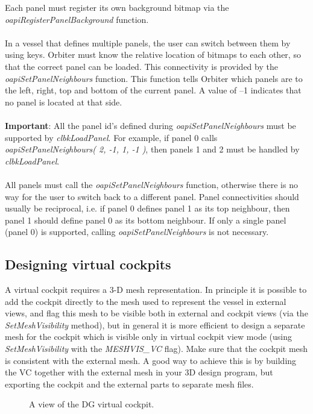 \documentclass[Orbiter Developer Manual.tex]{subfiles}
\begin{document}
\noindent
Each panel must register its own background bitmap via the \textit{oapiRegisterPanelBackground} function.\\
\\
In a vessel that defines multiple panels, the user can switch between them by using \Ctrl\DArrow\UArrow\RArrow\LArrow keys. Orbiter must know the relative location of bitmaps to each other, so that the correct panel can be loaded. This connectivity is provided by the \textit{oapiSetPanelNeighbours} function. This function tells Orbiter which panels are to the left, right, top and bottom of the current panel. A value of –1 indicates that no panel is located at that side.\\
\\
\textbf{Important}: All the panel id’s defined during \textit{oapiSetPanelNeighbours} must be supported by \textit{clbkLoadPanel}. For example, if panel 0 calls \textit{oapiSetPanelNeighbours( 2, -1, 1, -1 )}, then panels 1 and 2 must be handled by \textit{clbkLoadPanel}.\\
\\
All panels must call the \textit{oapiSetPanelNeighbours} function, otherwise there is no way for the user to switch back to a different panel. Panel connectivities should usually be reciprocal, i.e. if panel 0 defines panel 1 as its top neighbour, then panel 1 should define panel 0 as its bottom neighbour. If only a single panel (panel 0) is supported, calling \textit{oapiSetPanelNeighbours} is not necessary.


\subsection{Designing virtual cockpits}
\label{ssec:vc_design}
A virtual cockpit requires a 3-D mesh representation. In principle it is possible to add the cockpit directly to the mesh used to represent the vessel in external views, and flag this mesh to be visible both in external and cockpit views (via the \textit{SetMeshVisibility} method), but in general it is more efficient to design a separate mesh for the cockpit which is visible only in virtual cockpit view mode (using \textit{SetMeshVisibility} with the \textit{MESHVIS\_VC} flag). Make sure that the cockpit mesh is consistent with the external mesh. A good way to achieve this is by building the VC together with the external mesh in your 3D design program, but exporting the cockpit and the external parts to separate mesh files.

\begin{figure}[H]
	\centering
	\caption{A view of the DG virtual cockpit.}
\end{figure}
\end{document}
